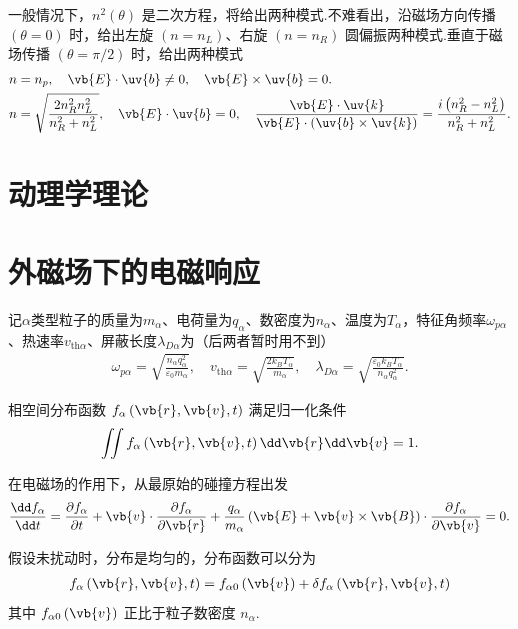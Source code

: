 一般情况下，\(n^2(\theta)\) 是二次方程，将给出两种模式.不难看出，沿磁场方向传播 \((\theta = 0)\) 时，给出左旋 \((n = n_L)\)、右旋 \((n = n_R)\) 圆偏振两种模式.垂直于磁场传播 \((\theta = \pi/2)\) 时，给出两种模式
\begin{align*}
	n &= n_p,\quad \vb{E}\cdot\uv{b}\neq0,\quad \vb{E}\times\uv{b} = 0. \\
	n &= \sqrt{\frac{2n_R^2 n_L^2}{n_R^2 + n_L^2}},\quad \vb{E}\cdot\uv{b} = 0,\quad \frac{\vb{E}\cdot\uv{k}}{\vb{E}\cdot\left( \uv{b}\times\uv{k} \right)} = \frac{i\left(n_R^2 - n_L^2\right)}{n_R^2 + n_L^2}.
\end{align*}

\section{动理学理论}

\section{外磁场下的电磁响应}
记\(\alpha\)类型粒子的质量为\(m_\alpha\)、电荷量为\(q_\alpha\)、数密度为\(n_\alpha\)、温度为\(T_\alpha\)，特征角频率\(\omega_{p\alpha}\)、热速率\(v_{\text{th}\alpha}\)、屏蔽长度\(\lambda_{D\alpha}\)为（后两者暂时用不到）
\begin{align*}
	\omega_{p\alpha} = \sqrt{\frac{n_\alpha q_\alpha^2}{\varepsilon_0 m_\alpha}},\quad
	v_{\text{th}\alpha} = \sqrt{\frac{2k_B T_\alpha}{m_\alpha}},\quad
	\lambda_{D\alpha} = \sqrt{\frac{\varepsilon_0 k_B T_\alpha}{n_\alpha q_\alpha^2}}.
\end{align*}

相空间分布函数 \(f_\alpha\left( \vb{r},\vb{v},t \right)\) 满足归一化条件
\begin{align*}
	\iint f_\alpha\left( \vb{r},\vb{v},t \right)\dd \vb{r}\dd \vb{v} = 1.
\end{align*}

在电磁场的作用下，从最原始的碰撞方程出发
\begin{align*}
	\frac{\dd f_\alpha}{\dd t} = \frac{\partial f_\alpha}{\partial t} + \vb{v}\cdot\frac{\partial f_\alpha}{\partial \vb{r}} + \frac{q_\alpha}{m_\alpha}\left( \vb{E} + \vb{v}\times\vb{B} \right)\cdot\frac{\partial f_\alpha}{\partial \vb{v}} = 0.
\end{align*}

假设未扰动时，分布是均匀的，分布函数可以分为
\begin{align*}
	f_\alpha\left( \vb{r},\vb{v},t \right) = f_{\alpha0}\left( \vb{v} \right) + \delta f_\alpha\left( \vb{r},\vb{v},t \right)
\end{align*}
其中 \(f_{\alpha0}\left( \vb{v} \right)\) 正比于粒子数密度 \(n_\alpha\).

